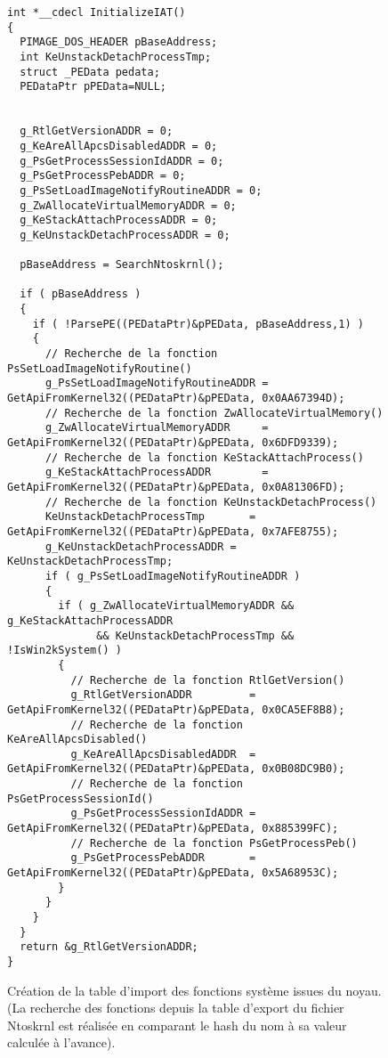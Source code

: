 \documentclass[times,11pt,fullpage]{article}
\begin{document}
\begin{figure}
\begin{framed}
\scriptsize
\begin{verbatim}
int *__cdecl InitializeIAT()
{
  PIMAGE_DOS_HEADER pBaseAddress; 
  int KeUnstackDetachProcessTmp; 
  struct _PEData pedata;
  PEDataPtr pPEData=NULL; 


  g_RtlGetVersionADDR = 0;
  g_KeAreAllApcsDisabledADDR = 0;
  g_PsGetProcessSessionIdADDR = 0;
  g_PsGetProcessPebADDR = 0;
  g_PsSetLoadImageNotifyRoutineADDR = 0;
  g_ZwAllocateVirtualMemoryADDR = 0;
  g_KeStackAttachProcessADDR = 0;
  g_KeUnstackDetachProcessADDR = 0;

  pBaseAddress = SearchNtoskrnl();

  if ( pBaseAddress )
  {
    if ( !ParsePE((PEDataPtr)&pPEData, pBaseAddress,1) )
    {
      // Recherche de la fonction PsSetLoadImageNotifyRoutine()
      g_PsSetLoadImageNotifyRoutineADDR = GetApiFromKernel32((PEDataPtr)&pPEData, 0x0AA67394D); 
      // Recherche de la fonction ZwAllocateVirtualMemory()
      g_ZwAllocateVirtualMemoryADDR     = GetApiFromKernel32((PEDataPtr)&pPEData, 0x6DFD9339); 
      // Recherche de la fonction KeStackAttachProcess()
      g_KeStackAttachProcessADDR        = GetApiFromKernel32((PEDataPtr)&pPEData, 0x0A81306FD); 
      // Recherche de la fonction KeUnstackDetachProcess()
      KeUnstackDetachProcessTmp       = GetApiFromKernel32((PEDataPtr)&pPEData, 0x7AFE8755); 
      g_KeUnstackDetachProcessADDR = KeUnstackDetachProcessTmp;
      if ( g_PsSetLoadImageNotifyRoutineADDR )
      {
        if ( g_ZwAllocateVirtualMemoryADDR && g_KeStackAttachProcessADDR 
              && KeUnstackDetachProcessTmp && !IsWin2kSystem() )
        {
          // Recherche de la fonction RtlGetVersion()
          g_RtlGetVersionADDR         = GetApiFromKernel32((PEDataPtr)&pPEData, 0x0CA5EF8B8); 
          // Recherche de la fonction KeAreAllApcsDisabled()
          g_KeAreAllApcsDisabledADDR  = GetApiFromKernel32((PEDataPtr)&pPEData, 0x0B08DC9B0);
          // Recherche de la fonction PsGetProcessSessionId()
          g_PsGetProcessSessionIdADDR = GetApiFromKernel32((PEDataPtr)&pPEData, 0x885399FC);  
          // Recherche de la fonction PsGetProcessPeb()
          g_PsGetProcessPebADDR       = GetApiFromKernel32((PEDataPtr)&pPEData, 0x5A68953C); 
        }
      }
    }
  }
  return &g_RtlGetVersionADDR;
}
\end{verbatim}
\end{framed}
\caption{Création de la table d'import des fonctions système issues du noyau. (La recherche des fonctions depuis la table d'export du fichier Ntoskrnl est réalisée en comparant le hash du nom à sa valeur calculée à l'avance).\label{fig:NtoskrnlIAT}}
\end{figure}
\end{document}
